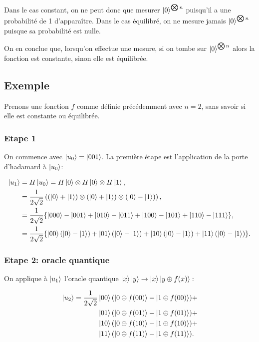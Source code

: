 Dans le cas constant, on ne peut donc que mesurer $\ket{0}^{\bigotimes n}$ puisqu'il a une probabilité de 1 d'apparaître. Dans le cas équilibré, on ne mesure jamais $\ket{0}^{\bigotimes n}$ puisque sa probabilité est nulle.

On en conclue que, lorsqu'on effectue une mesure, si on tombe sur $\ket{0}^{\bigotimes n}$ alors la fonction est constante, sinon elle est équilibrée.

\subsection{Exemple}

Prenons une fonction $f$ comme définie précédemment avec $n=2$, sans
savoir si elle est constante ou équilibrée.

\subsubsection{Etape 1}


On commence avec $\ket{u_0} = \ket{001}$. La première étape est
l'application de la porte d'hadamard à $\ket{u_0}$:

\begin{align}
\ket{u_1} &= H\ket{u_0} = H\ket{0} \otimes H\ket{0} \otimes H\ket{1} \nonumber ,\\
& = \frac{1}{2\sqrt{2}} \left( (\ket{0} + \ket{1})\otimes(\ket{0} + \ket{1})\otimes(\ket{0} - \ket{1}) \right) \nonumber ,\\
 & = \frac{1}{2\sqrt{2}}\{\ket{000} - \ket{001} + \ket{010} - \ket{011} + \ket{100} - \ket{101} + \ket{110} - \ket{111}\} \nonumber ,\\
& = \frac{1}{2\sqrt{2}}\{\ket{00}(\ket{0} - \ket{1}) + \ket{01}(\ket{0} - \ket{1}) + \ket{10}(\ket{0} - \ket{1}) + \ket{11}(\ket{0} - \ket{1})\} .
\end{align}


\subsubsection{Etape 2: oracle quantique}

On applique à $\ket{u_1}$ l'oracle quantique $\ket{x}\ket{y}\rightarrow\ket{x}\ket{y\oplus f(x)}:$

\begin{align*}
\ket{u_2}  =  \frac{1}{2\sqrt{2}}  & \ket{00}(\ket{0 \oplus f(00)} - \ket{1 \oplus f(00)}) + \\
& \ket{01}(\ket{0 \oplus f(01)} - \ket{1 \oplus f(01)}) + \\
& \ket{10}(\ket{0 \oplus f(10)} - \ket{1 \oplus f(10)}) + \\
& \ket{11}(\ket{0 \oplus f(11)} - \ket{1 \oplus f(11)}).
\end{align*}


